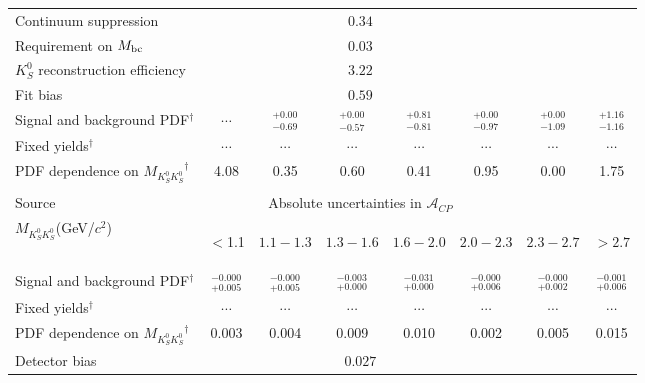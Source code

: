 \documentclass[aps,prl,preprint,tightenlines,superscriptaddress,,amsmath,byrevtex]{revtex4}
\def\KS     {\ensuremath{K^0_{\scriptscriptstyle S}}\xspace}
\newcommand{\mkk}{\ensuremath{M_{K_{S}^{0}K_{S}^{0}}}\xspace}
\def\mbc    {\mbox{$M_{\rm bc}$}\xspace}
\def\CP {\ensuremath{C\!P}\xspace}
\def\ACP{{\ensuremath{\mathcal{A}_{\CP}}\xspace}}
\begin{document}
\begin{table}[H]
\begin{center}
\begin{tabular}{lccccccc}
Continuum suppression & \multicolumn{5}{c}{$0.34$} \\
Requirement on $\mbc$ & \multicolumn{5}{c}{$0.03$} \\
$\KS$ reconstruction efficiency & \multicolumn{5}{c}{$3.22$} \\
Fit bias & \multicolumn{5}{c}{$0.59$} \\
Signal and background PDF$^\dagger$ &  $\cdots$  & $^{+0.00}_{-0.69}$  & $^{+0.00}_{-0.57}$ & $^{+0.81}_{-0.81}$ & $^{+0.00}_{-0.97}$ & $^{+0.00}_{-1.09}$ & $^{+1.16}_{-1.16}$ \\
Fixed yields$^\dagger$&  $\cdots$  & $\cdots$&  $\cdots$ & $\cdots$ & $\cdots$ & $\cdots$& $\cdots$ \\
PDF dependence on $\mkk^\dagger$ & 4.08 & 0.35 & 0.60 & 0.41 & 0.95  &0.00 & 1.75 \\
\hline\hline
\multicolumn{2}{c}{} \\
\hline\hline
Source & \multicolumn{5}{c}{Absolute uncertainties in $\ACP$} \\
$\mkk$(GeV/$c^2$) & \begin{scriptsize} $<$1.1 \end{scriptsize} & \begin{scriptsize}$1.1-1.3$   \end{scriptsize}  &  \begin{scriptsize}$1.3-1.6$ \end{scriptsize}   &  \begin{scriptsize} $1.6-2.0$  \end{scriptsize}  &  \begin{scriptsize} $2.0-2.3$  \end{scriptsize} &  \begin{scriptsize} $2.3-2.7$  \end{scriptsize} &  \begin{scriptsize} $> 2.7$ \end{scriptsize} \\
\hline
Signal and background PDF$^\dagger$ &$^{-0.000}_{+0.005}$ & $^{-0.000}_{+0.005}$ & $^{-0.003}_{+0.000}$&$^{-0.031}_{+0.000}$ & $^{-0.000}_{+0.006}$  & $^{-0.000}_{+0.002}$& $^{-0.001}_{+0.006}$ \\
Fixed yields$^\dagger$  & $\cdots$ & $\cdots$& $\cdots$& $\cdots$& $\cdots$ & $\cdots$  & $\cdots$ \\
 PDF dependence on $\mkk^\dagger$ & 0.003 &0.004 & 0.009 &  0.010 & 0.002  & 0.005 & 0.015 \\
Detector bias &  \multicolumn{5}{c}{$0.027$} \\
\hline\hline
\end{tabular}
\end{center}
\end{table}
\end{document}
